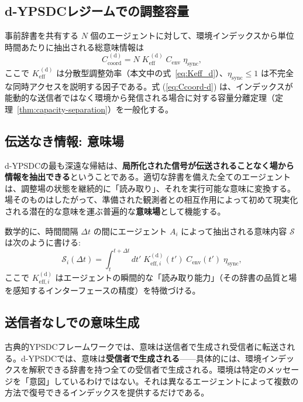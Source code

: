 \documentclass[12pt,a4paper]{article}
\theoremstyle{definition}
\theoremstyle{remark}
\begin{document}
	\subsection{d-YPSDCレジームでの調整容量}
	\label{subsec:coord-capacity-dypsdc}
	
	事前辞書を共有する $N$ 個のエージェントに対して、環境インデックスから単位時間あたりに抽出される総意味情報は
	\begin{equation}
		C_{\mathrm{coord}}^{\,(\mathrm{d})} = N \; K_{\mathrm{eff}}^{\,(\mathrm{d})} \;
		C_{\mathrm{env}} \; \eta_{\mathrm{sync}},
		\label{eq:Ccoord-d}
	\end{equation}
	ここで $K_{\mathrm{eff}}^{\,(\mathrm{d})}$ は分散型調整効率（本文中の式~\eqref{eq:Keff_d}）、$\eta_{\mathrm{sync}} \le 1$ は不完全な同時アクセスを説明する因子である。式 (\ref{eq:Ccoord-d}) は、インデックスが能動的な送信者ではなく環境から発信される場合に対する容量分離定理（定理~\ref{thm:capacity-separation}）を一般化する。
	
	\subsection{伝送なき情報: 意味場}
	\label{subsec:semantic-field}
	
	d-YPSDCの最も深遠な帰結は、\textbf{局所化された信号が伝送されることなく場から情報を抽出できる}ということである。適切な辞書を備えた全てのエージェントは、調整場の状態を継続的に「読み取り」、それを実行可能な意味に変換する。場そのものはしたがって、準備された観測者との相互作用によって初めて現実化される潜在的な意味を運ぶ普遍的な\textbf{意味場}として機能する。
	
	数学的に、時間間隔 $\Delta t$ の間にエージェント $A_i$ によって抽出される意味内容 $\mathcal{S}$ は次のように書ける:
	\begin{equation}
		\mathcal{S}_i(\Delta t) = \int_{t}^{t+\Delta t} dt' \;
		K_{\mathrm{eff},i}^{\mathrm{(d)}}(t') \; C_{\mathrm{env}}(t') \; \eta_{\mathrm{sync}},
		\label{eq:semantic-content}
	\end{equation}
	ここで $K_{\mathrm{eff},i}^{\mathrm{(d)}}$ はエージェントの瞬間的な「読み取り能力」（その辞書の品質と場を感知するインターフェースの精度）を特徴づける。
	
	\subsection{送信者なしでの意味生成}
	\label{subsec:meaning-generation}
	
	古典的YPSDCフレームワークでは、意味は送信者で生成され受信者に転送される。d-YPSDCでは、意味は\textbf{受信者で生成される}——具体的には、環境インデックスを解釈できる辞書を持つ全ての受信者で生成される。環境は特定のメッセージを「意図」しているわけではない。それは異なるエージェントによって複数の方法で復号できるインデックスを提供するだけである。
	
\end{document}
